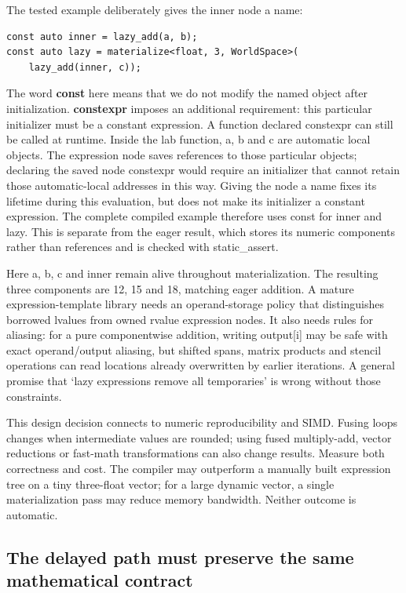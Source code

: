 The tested example deliberately gives the inner node a name:

\begin{verbatim}
const auto inner = lazy_add(a, b);
const auto lazy = materialize<float, 3, WorldSpace>(
    lazy_add(inner, c));
\end{verbatim}

The word \textbf{const} here means that we do not modify the named object after initialization. \textbf{constexpr} imposes an additional requirement: this particular initializer must be a constant expression. A function declared constexpr can still be called at runtime. Inside the lab function, a, b and c are automatic local objects. The expression node saves references to those particular objects; declaring the saved node constexpr would require an initializer that cannot retain those automatic-local addresses in this way. Giving the node a name fixes its lifetime during this evaluation, but does not make its initializer a constant expression. The complete compiled example therefore uses const for inner and lazy. This is separate from the eager result, which stores its numeric components rather than references and is checked with static\_assert.

Here a, b, c and inner remain alive throughout materialization. The resulting three components are 12, 15 and 18, matching eager addition. A mature expression-template library needs an operand-storage policy that distinguishes borrowed lvalues from owned rvalue expression nodes. It also needs rules for aliasing: for a pure componentwise addition, writing output{[}i{]} may be safe with exact operand/output aliasing, but shifted spans, matrix products and stencil operations can read locations already overwritten by earlier iterations. A general promise that `lazy expressions remove all temporaries' is wrong without those constraints.

This design decision connects to numeric reproducibility and SIMD. Fusing loops changes when intermediate values are rounded; using fused multiply-add, vector reductions or fast-math transformations can also change results. Measure both correctness and cost. The compiler may outperform a manually built expression tree on a tiny three-float vector; for a large dynamic vector, a single materialization pass may reduce memory bandwidth. Neither outcome is automatic.

\subsection{The delayed path must preserve the same mathematical contract}\label{05-engine-i-ch007-the-delayed-path-must-preserve-the-same-mathematical-contract}

